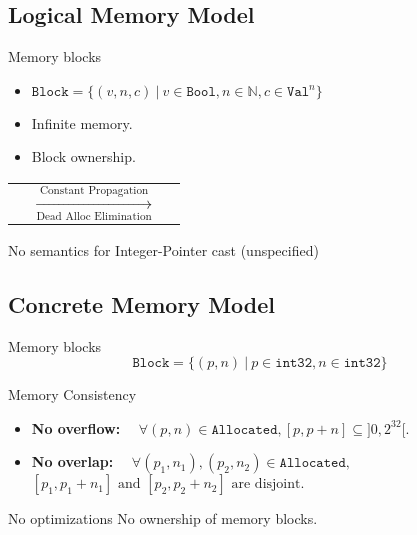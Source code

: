 \subsection{Logical Memory Model}
\begin{frame}{\subsecname}

  \begin{block}{Memory blocks}
    \begin{itemize}
    \item $\texttt{Block}=\{(v,n,c)~|~v\in\texttt{Bool},n\in\mathbb{N},c\in\texttt{Val}^{n}\}$
    \item Infinite memory.
    \item Block ownership.
    \end{itemize}
  \end{block}
  \vfill
  \begin{center}
    \begin{tabular}{l c r}
       &
      $\xrightarrow[\text{Dead Alloc Elimination}]{\text{Constant Propagation}}$ &
      
    \end{tabular}
  \end{center}
  \vfill
  \begin{alertblock}{No semantics for Integer-Pointer cast (unspecified)}
  \end{alertblock}
  
\end{frame}

\subsection{Concrete Memory Model}
\begin{frame}{\subsecname}

  \begin{block}{Memory blocks}
    $$\texttt{Block}=\{(p,n)~|~p\in\texttt{int32},n\in\texttt{int32}\}$$
  \end{block}
  \vfill
  \begin{block}{Memory Consistency}
    \begin{itemize}
    \item \textbf{No overflow:} $\quad\forall (p,n)\in\texttt{Allocated}, [p,p+n]\subseteq]0,2^{32}[$.
      \item \textbf{No overlap:} $\quad\forall (p_1,n_1), (p_2,n_2)\in\texttt{Allocated},$\\ $[p_1,p_1+n_1]\text{ and }[p_2,p_2+n_2]\text{ are disjoint.}$
    \end{itemize}
  \end{block}
  \vfill
  \begin{alertblock}{No optimizations}
    No ownership of memory blocks.
  \end{alertblock}

\end{frame}

